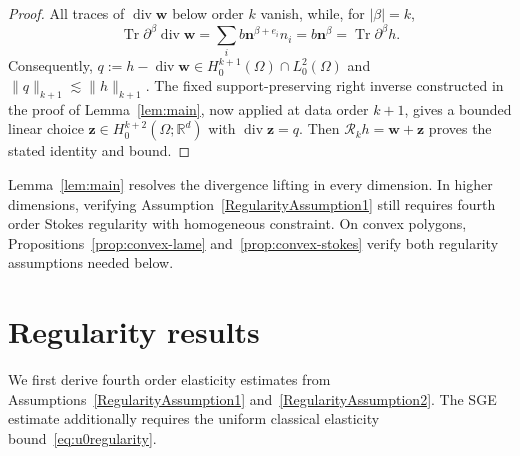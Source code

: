 \documentclass[10pt]{amsart}
\renewcommand{\div}{\operatorname{div}}
\numberwithin{equation}{section}
\begin{document}
\begin{proof}
All traces of $\div\boldsymbol w$ below order $k$ vanish, while, for $|\beta|=k$,
\[
\operatorname{Tr}\partial^\beta\div\boldsymbol w
=\sum_i b\boldsymbol n^{\beta+e_i}n_i
=b\boldsymbol n^\beta=\operatorname{Tr}\partial^\beta h.
\]
Consequently, $q:=h-\div\boldsymbol w\in H_0^{k+1}(\Omega)\cap L_0^2(\Omega)$ and $\|q\|_{k+1}\lesssim\|h\|_{k+1}$. The fixed support-preserving right inverse constructed in the proof of Lemma~\ref{lem:main}, now applied at data order $k+1$, gives a bounded linear choice $\boldsymbol z\in H_0^{k+2}(\Omega;\mathbb R^d)$ with $\div\boldsymbol z=q$. Then $\mathcal R_kh=\boldsymbol w+\boldsymbol z$ proves the stated identity and bound.
\end{proof}

Lemma~\ref{lem:main} resolves the divergence lifting in every dimension. In higher dimensions, verifying Assumption~\ref{RegularityAssumption1} still requires fourth order Stokes regularity with homogeneous constraint. On convex polygons, Propositions~\ref{prop:convex-lame} and~\ref{prop:convex-stokes} verify both regularity assumptions needed below.

\section{Regularity results}\label{sec:regularity}

We first derive fourth order elasticity estimates from Assumptions~\ref{RegularityAssumption1} and~\ref{RegularityAssumption2}. The SGE estimate additionally requires the uniform classical elasticity bound~\eqref{eq:u0regularity}.
\end{document}

